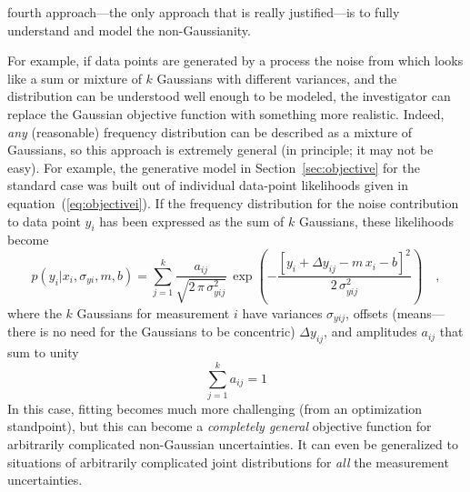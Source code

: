 \documentclass[12pt,twoside,pdftex]{article}
\newcommand{\sectionname}{Section}
\newcommand{\equationname}{equation}
\begin{document}
fourth approach---the only approach that is really justified---is to
fully understand and model the non-Gaussianity.

For example, if data points are generated by a process the noise from
which looks like a sum or mixture of $k$ Gaussians with different
variances, and the distribution can be understood well enough to be
modeled, the investigator can replace the Gaussian objective function
with something more realistic.  Indeed, \emph{any} (reasonable)
frequency distribution can be described as a mixture of Gaussians, so
this approach is extremely general (in principle; it may not be easy).
For example, the generative model in \sectionname~\ref{sec:objective}
for the standard case was built out of individual data-point
likelihoods given in \equationname~(\ref{eq:objectivei}).  If the
frequency distribution for the noise contribution to data point $y_i$
has been expressed as the sum of $k$ Gaussians, these likelihoods
become
\begin{equation}
p(y_i|x_i,\sigma_{yi},m,b) = \sum_{j=1}^k
 \frac{a_{ij}}{\sqrt{2\,\pi\,\sigma_{yij}^2}}
 \,\exp\left(-\frac{[y_i+\Delta y_{ij}-m\,x_i-b]^2}{2\,\sigma_{yij}^2}\right)
 \quad ,
\end{equation}
where the $k$ Gaussians for measurement $i$ have variances
$\sigma_{yij}$, offsets (means---there is no need for the Gaussians to
be concentric) $\Delta y_{ij}$, and amplitudes $a_{ij}$ that sum to
unity
\begin{equation}
\sum_{j=1}^k a_{ij} = 1
\end{equation}
In this case, fitting becomes much more challenging (from an
optimization standpoint), but this can become a \emph{completely
  general} objective function for arbitrarily complicated non-Gaussian
uncertainties.  It can even be generalized to situations of
arbitrarily complicated joint distributions for \emph{all} the
measurement uncertainties.
\end{document}
